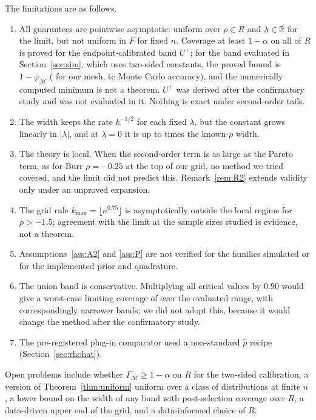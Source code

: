 \documentclass[11pt]{article}
\theoremstyle{definition}
\theoremstyle{remark}
\numberwithin{equation}{section}
\newcommand{\R}{\mathbb{R}}
\newcommand{\Mesh}{\mathcal{M}}
\begin{document}
The limitations are as follows.
\begin{enumerate}
\item All guarantees are pointwise asymptotic: uniform over $\rho\in R$ and $\lambda\in\R$ for the limit, but not uniform in $F$ for fixed $n$. Coverage at least $1-\alpha$ on all of $R$ is proved for the endpoint-calibrated band $U^+$; for the band evaluated in Section~\ref{sec:sim}, which uses two-sided constants, the proved bound is $1-\varphi_\Mesh$ (\boundTwo{} for our mesh, to Monte Carlo accuracy), and the numerically computed minimum \GammaMinR{} is not a theorem. $U^+$ was derived after the confirmatory study and was not evaluated in it. Nothing is exact under second-order tails.
\item The width keeps the rate $k^{-1/2}$ for each fixed $\lambda$, but the constant grows linearly in $|\lambda|$, and at $\lambda=0$ it is up to \widthRatioZero{} times the known-$\rho$ width.
\item The theory is local. When the second-order term is as large as the Pareto term, as for Burr $\rho=-0.25$ at the top of our grid, no method we tried covered, and the limit did not predict this. Remark~\ref{rem:R2} extends validity only under an unproved expansion.
\item The grid rule $k_{\max}=\lfloor n^{0.75}\rfloor$ is asymptotically outside the local regime for $\rho>-1.5$; agreement with the limit at the sample sizes studied is evidence, not a theorem.
\item Assumptions~\ref{ass:A2} and \ref{ass:P} are not verified for the families simulated or for the implemented prior and quadrature.
\item The union band is conservative. Multiplying all critical values by $0.90$ would give a worst-case limiting coverage of \kappaWorst{} over the evaluated range, with correspondingly narrower bands; we did not adopt this, because it would change the method after the confirmatory study.
\item The pre-registered plug-in comparator used a non-standard $\hat\rho$ recipe (Section~\ref{sec:rhohat}).
\end{enumerate}

Open problems include whether $\Gamma_\Mesh\ge1-\alpha$ on $R$ for the two-sided calibration, a version of Theorem~\ref{thm:uniform} uniform over a class of distributions at finite $n$, a lower bound on the width of any band with post-selection coverage over $R$, a data-driven upper end of the grid, and a data-informed choice of $R$.
\end{document}
